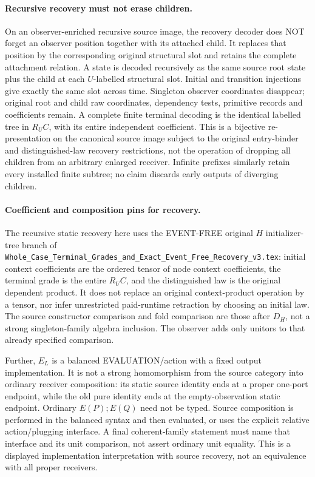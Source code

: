 \documentclass{article}
\begin{document}
\paragraph{Recursive recovery must not erase children.}
On an observer-enriched recursive source image, the recovery decoder does NOT forget an observer position together with its attached child. It replaces that position by the corresponding original structural slot and retains the complete attachment relation. A state is decoded recursively as the same source root state plus the child at each $U$-labelled structural slot. Initial and transition injections give exactly the same slot across time. Singleton observer coordinates disappear; original root and child raw coordinates, dependency tests, primitive records and coefficients remain. A complete finite terminal decoding is the identical labelled tree in $R_U C$, with its entire independent coefficient. This is a bijective re-presentation on the canonical source image subject to the original entry-binder and distinguished-law recovery restrictions, not the operation of dropping all children from an arbitrary enlarged receiver. Infinite prefixes similarly retain every installed finite subtree; no claim discards early outputs of diverging children.

\paragraph{Coefficient and composition pins for recovery.}
The recursive static recovery here uses the EVENT-FREE original $H$ initializer-tree branch of \texttt{Whole\_Case\_Terminal\_Grades\_and\_Exact\_Event\_Free\_Recovery\_v3.tex}: initial context coefficients are the ordered tensor of node context coefficients, the terminal grade is the entire $R_U C$, and the distinguished law is the original dependent product. It does not replace an original context-product operation by a tensor, nor infer unrestricted paid-runtime retraction by choosing an initial law. The source constructor comparison and fold comparison are those after $D_H$, not a strong singleton-family algebra inclusion. The observer adds only unitors to that already specified comparison.

Further, $E_L$ is a balanced EVALUATION/action with a fixed output implementation. It is not a strong homomorphism from the source category into ordinary receiver composition: its static source identity ends at a proper one-port endpoint, while the old pure identity ends at the empty-observation static endpoint. Ordinary $E(P);E(Q)$ need not be typed. Source composition is performed in the balanced syntax and then evaluated, or uses the explicit relative action/plugging interface. A final coherent-family statement must name that interface and its unit comparison, not assert ordinary unit equality. This is a displayed implementation interpretation with source recovery, not an equivalence with all proper receivers.
\end{document}
